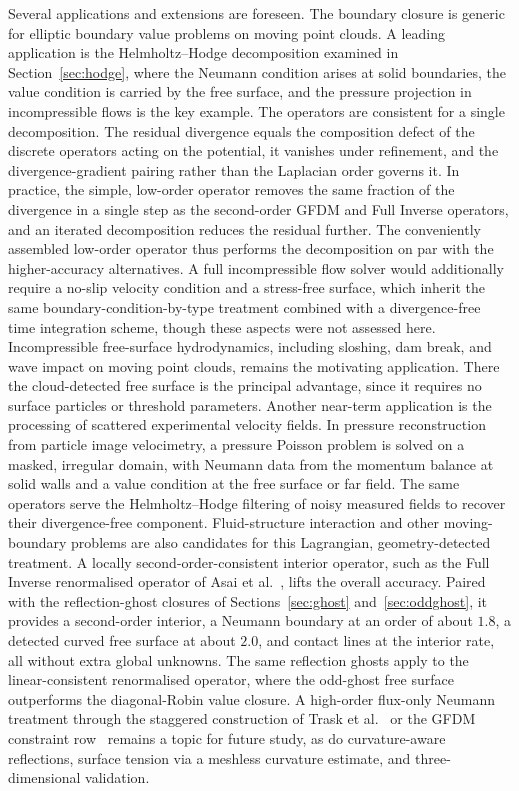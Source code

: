 \documentclass[preprint,review,12pt]{elsarticle}
\begin{document}
Several applications and extensions are foreseen.
The boundary closure is generic for elliptic boundary value problems on moving point clouds.
A leading application is the Helmholtz--Hodge decomposition examined in Section~\ref{sec:hodge}, where the Neumann condition arises at solid boundaries, the value condition is carried by the free surface, and the pressure projection in incompressible flows is the key example.
The operators are consistent for a single decomposition.
The residual divergence equals the composition defect of the discrete operators acting on the potential, it vanishes under refinement, and the divergence-gradient pairing rather than the Laplacian order governs it.
In practice, the simple, low-order operator removes the same fraction of the divergence in a single step as the second-order GFDM and Full Inverse operators, and an iterated decomposition reduces the residual further.
The conveniently assembled low-order operator thus performs the decomposition on par with the higher-accuracy alternatives.
A full incompressible flow solver would additionally require a no-slip velocity condition and a stress-free surface, which inherit the same boundary-condition-by-type treatment combined with a divergence-free time integration scheme, though these aspects were not assessed here.
Incompressible free-surface hydrodynamics, including sloshing, dam break, and wave impact on moving point clouds, remains the motivating application.
There the cloud-detected free surface is the principal advantage, since it requires no surface particles or threshold parameters.
Another near-term application is the processing of scattered experimental velocity fields.
In pressure reconstruction from particle image velocimetry, a pressure Poisson problem is solved on a masked, irregular domain, with Neumann data from the momentum balance at solid walls and a value condition at the free surface or far field.
The same operators serve the Helmholtz--Hodge filtering of noisy measured fields to recover their divergence-free component.
Fluid-structure interaction and other moving-boundary problems are also candidates for this Lagrangian, geometry-detected treatment.
A locally second-order-consistent interior operator, such as the Full Inverse renormalised operator of Asai et al.~\cite{Asai2023}, lifts the overall accuracy.
Paired with the reflection-ghost closures of Sections~\ref{sec:ghost} and~\ref{sec:oddghost}, it provides a second-order interior, a Neumann boundary at an order of about $1.8$, a detected curved free surface at about $2.0$, and contact lines at the interior rate, all without extra global unknowns.
The same reflection ghosts apply to the linear-consistent renormalised operator, where the odd-ghost free surface outperforms the diagonal-Robin value closure.
A high-order flux-only Neumann treatment through the staggered construction of Trask et al.~\cite{Trask2017} or the GFDM constraint row~\cite{Kuhnert2001,Tiwari2003} remains a topic for future study, as do curvature-aware reflections, surface tension via a meshless curvature estimate, and three-dimensional validation.
\end{document}
